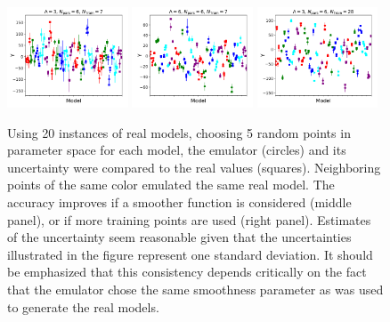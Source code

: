 \documentclass[12pt]{article}
\numberwithin{equation}{section}
\numberwithin{figure}{section}
\begin{document}
\begin{figure}
\includegraphics[width=0.32\textwidth]{sixpars/NPars6_Lambda3_NTrain7}\hspace*{0.02\textwidth}
\includegraphics[width=0.32\textwidth]{sixpars/NPars6_Lambda6_NTrain7}\hspace*{0.02\textwidth}
\includegraphics[width=0.32\textwidth]{sixpars/NPars6_Lambda3_NTrain28}
\caption{\label{fig:sixpars}
Using 20 instances of real models, choosing 5 random points in parameter space for each model, the emulator (circles) and its uncertainty were compared to the real values (squares). Neighboring points of the same color emulated the same real model. The accuracy improves if a smoother function is considered (middle panel), or if more training points are used (right panel). Estimates of the uncertainty seem reasonable given that the uncertainties illustrated in the figure represent one standard deviation. It should be emphasized that this consistency depends critically on the fact that the emulator chose the same smoothness parameter as was used to generate the real models.
}
\end{figure}
\end{document}
